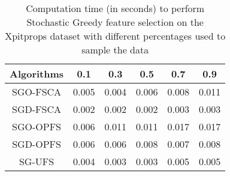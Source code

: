\begin{table}
	\begin{center}
		\begin{tabular}{c c c c c c}
			Algorithms & 0.1 & 0.3 & 0.5 & 0.7 & 0.9 \\
			\hline
			SGO-FSCA & 0.005 & 0.004 & 0.006 & 0.008 & 0.011 \\
			SGD-FSCA & 0.002 & 0.002 & 0.002 & 0.003 & 0.003 \\
			SGO-OPFS & 0.006 & 0.011 & 0.011 & 0.017 & 0.017 \\
			SGD-OPFS & 0.006 & 0.006 & 0.008 & 0.007 & 0.008 \\
			SG-UFS & 0.004 & 0.003 & 0.003 & 0.005 & 0.005 \\
		\end{tabular}
	\end{center}
	\caption{Computation time (in seconds) to perform Stochastic Greedy feature selection on the Xpitprops dataset with different percentages used to sample the data}
\end{table}